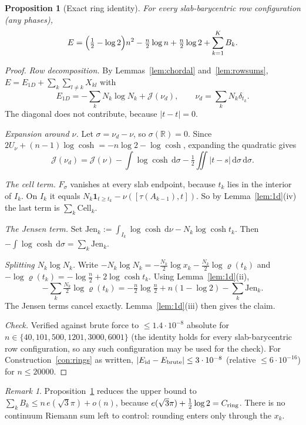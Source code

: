 \documentclass[11pt]{article}
\newtheorem{proposition}[theorem]{Proposition}
\theoremstyle{definition}
\theoremstyle{remark}
\newtheorem{remark}[theorem]{Remark}
\newcommand{\R}{\mathbb R}
\newcommand{\dd}{\,\mathrm d}
\begin{document}
\begin{proposition}[Exact ring identity]\label{prop:ring-identity}
For every slab-barycentric row configuration (any phases),
\[
E=\Bigl(\tfrac12-\log2\Bigr)n^2-\tfrac n2\log n+\tfrac n2\log2+\sum_{k=1}^KB_k .
\]
\end{proposition}
\begin{proof}
\emph{Row decomposition.} By Lemmas~\ref{lem:chordal} and~\ref{lem:rowsums},
$E=E_{1D}+\sum_k\sum_{l\ne k}X_{kl}$ with
\[
E_{1D}=-\sum_kN_k\log N_k+\mathcal J(\nu_d),\qquad \nu_d=\sum_kN_k\delta_{t_k}.
\]
The diagonal does not contribute, because $|t-t|=0$.

\emph{Expansion around $\nu$.} Let $\sigma=\nu_d-\nu$, so $\sigma(\R)=0$. Since
$2U_\nu+(n-1)\log\cosh=-n\log2-\log\cosh$, expanding the quadratic gives
\[
\mathcal J(\nu_d)=\mathcal J(\nu)-\int\log\cosh\dd\sigma-\tfrac12\iint|t-s|\dd\sigma\dd\sigma .
\]

\emph{The cell term.} $F_\sigma$ vanishes at every slab endpoint, because $t_k$ lies in the
interior of $I_k$. On $I_k$ it equals $N_k\mathbf 1_{t\ge t_k}-\nu([\tau(A_{k-1}),t])$. So by
Lemma~\ref{lem:1d}(iv) the last term is $\sum_k\mathrm{Cell}_k$.

\emph{The Jensen term.} Set $\mathrm{Jen}_k:=\int_{I_k}\log\cosh\dd\nu-N_k\log\cosh t_k$. Then
$-\int\log\cosh\dd\sigma=\sum_k\mathrm{Jen}_k$.

\emph{Splitting $N_k\log N_k$.} Write
$-N_k\log N_k=-\tfrac{N_k}2\log x_k-\tfrac{N_k}{2}\log\varrho(t_k)$ and
$-\log\varrho(t_k)=-\log\tfrac n2+2\log\cosh t_k$. Using Lemma~\ref{lem:1d}(ii),
\[
-\sum_k\tfrac{N_k}2\log\varrho(t_k)=-\tfrac n2\log\tfrac n2+n(1-\log2)-\sum_k\mathrm{Jen}_k .
\]
The Jensen terms cancel exactly. Lemma~\ref{lem:1d}(iii) then gives the claim.

\emph{Check.} Verified against brute force to $\le1.4\cdot10^{-8}$ absolute for
$n\in\{40,101,500,1201,3000,6001\}$ (the identity holds for every slab-barycentric row
configuration, so any such configuration may be used for the check). For Construction~\ref{con:rings}
as written, $|E_{\rm id}-E_{\rm brute}|\le3\cdot10^{-8}$ (relative $\le6\cdot10^{-16}$) for
$n\le20000$.
\end{proof}

\begin{remark}
Proposition~\ref{prop:ring-identity} reduces the upper bound to
$\sum_kB_k\le n\,e(\sqrt3\pi)+o(n)$, because $e(\sqrt3\pi)+\tfrac12\log2=C_{\rm ring}$. There is
no continuum Riemann sum left to control: rounding enters only through the $x_k$.
\end{remark}
\end{document}
